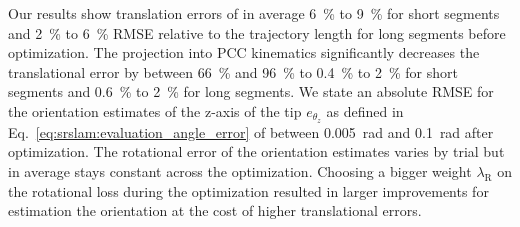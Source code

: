Our results show translation errors of in average \SI{6}{\percent} to \SI{9}{\percent} for short segments and \SI{2}{\percent} to \SI{6}{\percent} \gls{RMSE} relative to the trajectory length for long segments before optimization. 
The projection into \gls{PCC} kinematics significantly decreases the translational error by between \SI{66}{\percent} and \SI{96}{\percent} to \SI{0.4}{\percent} to \SI{2}{\percent} for short segments and \SI{0.6}{\percent} to \SI{2}{\percent} for long segments.
%
We state an absolute \gls{RMSE} for the orientation estimates of the z-axis of the tip $e_{\theta_z}$ as defined in Eq.~\ref{eq:srslam:evaluation_angle_error} of between \SI{0.005}{\radian} and \SI{0.1}{\radian} after optimization.
The rotational error of the orientation estimates varies by trial but in average stays constant across the optimization. 
Choosing a bigger weight $\lambda_\mathrm{R}$ on the rotational loss during the optimization resulted in larger improvements for estimation the orientation at the cost of higher translational errors.